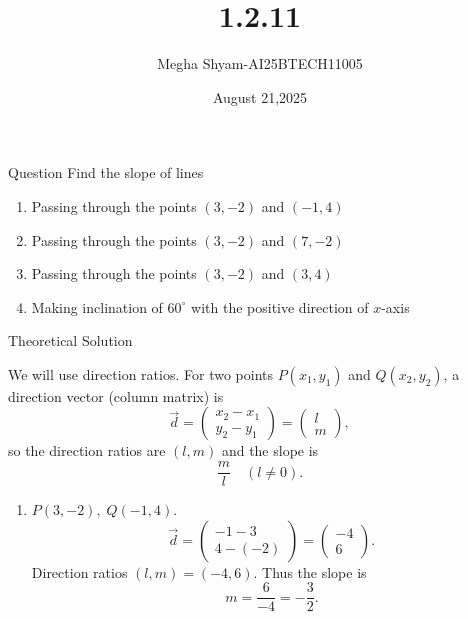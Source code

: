 \documentclass{beamer}
\title %
{1.2.11}
\date{August 21,2025}
\author %
{Megha Shyam-AI25BTECH11005}
\begin{document}
\frame{\titlepage}
\begin{frame}{Question}
 Find the slope of lines
\begin{enumerate}
    \item Passing through the points $(3, -2)$ and $(-1, 4)$
    \item Passing through the points $(3, -2)$ and $(7, -2)$
    \item Passing through the points $(3, -2)$ and $(3, 4)$
    \item Making inclination of $60^\circ$ with the positive direction of $x$-axis
\end{enumerate}
\end{frame}



\begin{frame}{Theoretical Solution}

We will use direction ratios. For two points \(P(x_1,y_1)\) and \(Q(x_2,y_2)\), a direction vector (column matrix) is
\[
\vec{d}=\begin{pmatrix}x_2-x_1\\[4pt]y_2-y_1\end{pmatrix}=\begin{pmatrix}l\\[4pt]m\end{pmatrix},
\]
so the direction ratios are \((l,m)\) and the slope is 
\[
\frac{m}{l}\quad (l\neq0).
\]

\begin{enumerate}
\item \(P(3,-2),\;Q(-1,4)\).
\[
\vec{d}=\begin{pmatrix}-1-3\\[4pt]4-(-2)\end{pmatrix}=\begin{pmatrix}-4\\[4pt]6\end{pmatrix}.
\]
Direction ratios \((l,m)=(-4,6)\). Thus the slope is
\[
m=\frac{6}{-4}=-\frac{3}{2}.
\]
\end{enumerate}
\end{frame}
\end{document}

